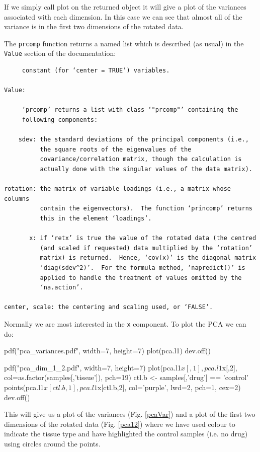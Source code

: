 \documentclass[11pt]{article}
\begin{document}
If we simply call plot on the returned object it will give a plot of the
variances associated with each dimension. In this case we can see that
almost all of the variance is in the first two dimensions of the 
rotated data.

The \texttt{prcomp} function returns a named list which is described (as
usual) in the \texttt{Value} section of the documentation:

\begin{verbatim}
     constant (for ‘center = TRUE’) variables.

Value:

     ‘prcomp’ returns a list with class ‘"prcomp"’ containing the
     following components:

    sdev: the standard deviations of the principal components (i.e.,
          the square roots of the eigenvalues of the
          covariance/correlation matrix, though the calculation is
          actually done with the singular values of the data matrix).

rotation: the matrix of variable loadings (i.e., a matrix whose columns
          contain the eigenvectors).  The function ‘princomp’ returns
          this in the element ‘loadings’.

       x: if ‘retx’ is true the value of the rotated data (the centred
          (and scaled if requested) data multiplied by the ‘rotation’
          matrix) is returned.  Hence, ‘cov(x)’ is the diagonal matrix
          ‘diag(sdev^2)’.  For the formula method, ‘napredict()’ is
          applied to handle the treatment of values omitted by the
          ‘na.action’.

center, scale: the centering and scaling used, or ‘FALSE’.
\end{verbatim}

Normally we are most interested in the \texttt{x} component. To plot the PCA
we can do:

\begin{rcode}
 pdf("pca_variances.pdf", width=7, height=7)
 plot(pca.l1)
 dev.off()

 pdf("pca_dim_1_2.pdf", width=7, height=7)
 plot(pca.l1$x[,1], pca.l1$x[,2], col=as.factor(samples[,'tissue']),
      pch=19)
 ctl.b <- samples[,'drug'] == 'control'
 points(pca.l1$x[ctl.b,1], pca.l1$x[ctl.b,2], col='purple', 
      lwd=2, pch=1, cex=2)
 dev.off()
\end{rcode}

This will give us a plot of the variances (Fig. \ref{pcaVar}) and a plot
of the first two dimensions of the rotated data (Fig. \ref{pca12}) where
we have used colour to indicate the tissue type and have highlighted
the control samples (i.e. no drug) using circles around the points.
\end{document}

